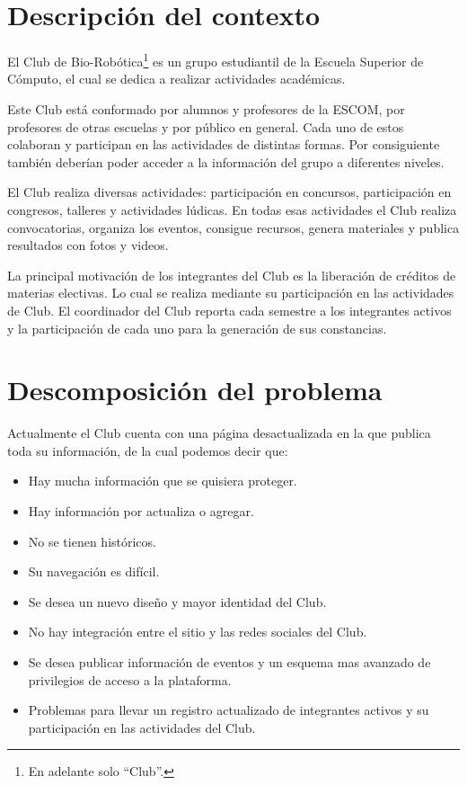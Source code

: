 \section{Descripción del contexto}

	El Club de Bio-Robótica\footnote{En adelante solo ``Club''.} es un grupo estudiantil de la Escuela Superior de Cómputo, el cual se dedica a realizar actividades académicas.
	
	Este Club está conformado por alumnos y profesores de la ESCOM, por profesores de otras escuelas y por público en general. Cada uno de estos  colaboran y participan en las actividades de distintas formas. Por consiguiente también deberían poder acceder a la información del grupo a diferentes niveles.
	
	El Club realiza diversas actividades: participación en concursos, participación en congresos, talleres y actividades lúdicas. En todas esas actividades el Club realiza convocatorias, organiza los eventos, consigue recursos, genera materiales y publica resultados con fotos y videos.	
	
	La principal motivación de los integrantes del Club es la liberación de créditos de materias electivas. Lo cual se realiza mediante su participación en las actividades de Club. El coordinador del Club reporta cada semestre a los integrantes activos y la participación de cada uno para la generación de sus constancias.
	
\section{Descomposición del problema}

	Actualmente el Club cuenta con una página desactualizada en la que publica toda su información, de la cual podemos decir que:
	
\begin{itemize}
	\item Hay mucha información que se quisiera proteger.
	\item Hay información por actualiza o agregar.
	\item No se tienen históricos.
	\item Su navegación es difícil.
	\item Se desea un nuevo diseño y mayor identidad del Club.
	\item No hay integración entre el sitio y las redes sociales del Club.
	\item Se desea publicar información de eventos y un esquema mas avanzado de privilegios de acceso a la plataforma.
	\item Problemas para llevar un registro actualizado de integrantes activos y su participación en las actividades del Club.
\end{itemize}

